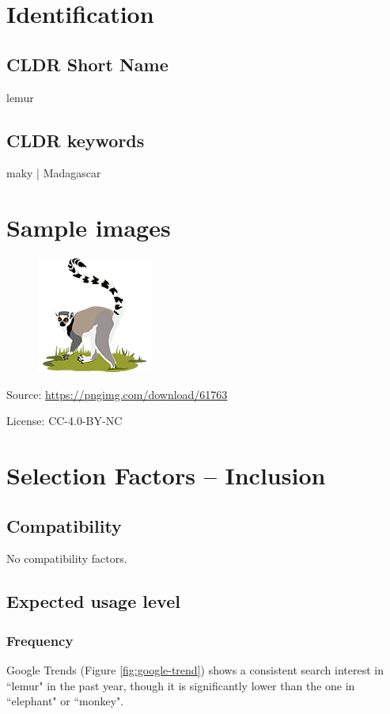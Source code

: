\documentclass{article}
\begin{document}
\section{Identification}
\subsection{CLDR Short Name}
lemur

\subsection{CLDR keywords}
maky | Madagascar

\section{Sample images}

\begin{figure}[h]
  \includegraphics[scale=0.5]{img/lemur-color.png}
\end{figure}

Source: \url{https://pngimg.com/download/61763}

License: CC-4.0-BY-NC

\section{Selection Factors -- Inclusion}
\subsection{Compatibility}
No compatibility factors.

\subsection{Expected usage level}
\subsubsection{Frequency}

Google Trends (Figure \ref{fig:google-trend}) shows a consistent search interest in ``lemur" in the past year, though it is significantly lower than the one in ``elephant" or ``monkey".
\end{document}

